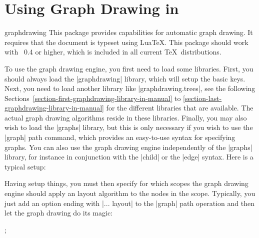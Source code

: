 %
%
%


\section{Using Graph Drawing in \tikzname}

{

\begin{tikzlibrary}{graphdrawing}
  This package provides capabilities for automatic graph drawing. It
  requires that the document is typeset using Lua\TeX. This package
  should work with \LuaTeX\ 0.4 or higher, which is included in all
  current \TeX\ distributions. 
\end{tikzlibrary}


To use the graph drawing engine, you first need to load some
libraries. First, you should always load the |graphdrawing| library,
which will setup the basic keys. Next, you need to load another
library like |graphdrawing.trees|, see the following
Sections~\ref{section-first-graphdrawing-library-in-manual} to
\ref{section-last-graphdrawing-library-in-manual} for the different
libraries that are available. The actual graph drawing
algorithms reside in these libraries. Finally, you may also wish to
load the |graphs| library, but this is only necessary if you wish to
use the |graph| path command, which provides an easy-to-use syntax for
specifying graphs. You can also use the graph drawing engine
independently of the |graphs| library, for instance in conjunction
with the |child| or the |edge| syntax. Here is a typical setup:

\begin{codeexample}
\usetikzlibrary{graphs,graphdrawing,graphdrawing.trees}  
\end{codeexample}

Having setup things, you must then specify for which scopes the
graph drawing engine should apply an layout algorithm to the nodes in
the scope. Typically, you just add an option ending with |... layout|
to the |graph| path operation and then let the graph drawing do its
magic:

\begin{codeexample}[]
  ;    
\end{codeexample}

}

